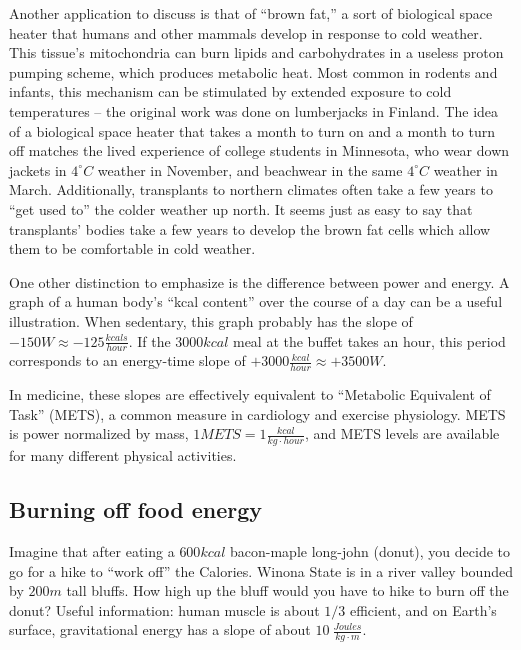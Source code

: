 \documentclass[prb,preprint]{revtex4-2}
\newcommand{\degC}{^{\circ}C}
\begin{document}
Another application to discuss is that of ``brown fat,'' a sort of biological space heater that humans and other mammals develop in response to cold weather.  This tissue's mitochondria can burn lipids and carbohydrates in a useless proton pumping scheme, which produces metabolic heat.\cite{brown_fat_1,brown_fat_2,brown_fat_3,brown_fat_4}  Most common in rodents and infants, this mechanism can be stimulated by extended exposure to cold temperatures -- the original work was done on lumberjacks in Finland.\cite{finland_lumberjacks}  
The idea of a biological space heater that takes a month to turn on and a month to turn off matches the lived experience of college students in Minnesota, who wear down jackets in $4\degC$ weather in November, and beachwear in the same $4\degC$ weather in March.  Additionally, transplants to northern climates often take a few years to ``get used to'' the colder weather up north. It seems just as easy to say that transplants' bodies take a few years to develop the brown fat cells which allow them to be comfortable in cold weather.

One other distinction to emphasize is the difference between power and energy.  A graph of a human body's ``kcal content'' over the course of a day can be a useful illustration.  When sedentary, this graph probably has the slope of $-150W\approx -125 \frac{kcals}{hour}$.  If the $3000kcal$ meal at the buffet takes an hour, this period corresponds to an energy-time slope of 
$+3000\frac{kcal}{hour}\approx +3500W$.  

In medicine, these slopes are effectively equivalent to ``Metabolic Equivalent of Task'' (METS), a common measure in cardiology and exercise physiology.  METS is power normalized by mass, $1METS=1\frac{kcal}{kg\cdot hour}$, and METS levels are available for many different physical activities.\cite{METS}

\subsection{Burning off food energy}
Imagine that after eating a $600kcal$ bacon-maple long-john (donut), you decide to go for a hike to ``work off'' the Calories.  Winona State  is in a river valley bounded by $200m$ tall bluffs.  How high up the bluff would you have to hike to burn off the donut?  
Useful information: human muscle is about $1/3$ efficient, and on Earth's surface, gravitational energy has a slope of about $10~\frac{Joules}{kg\cdot m}$.
\end{document}
